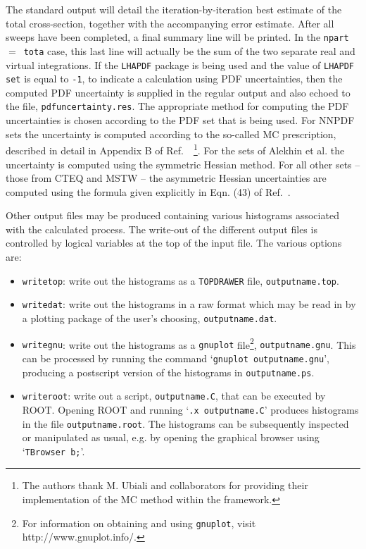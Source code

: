 \documentclass{article}
\begin{document}
The standard output will detail the iteration-by-iteration best estimate
of the total cross-section, together with the accompanying error estimate.
After all sweeps have been completed, a final summary line will be printed.
In the {\tt npart}~$=$~{\tt tota} case, this last line will actually be the
sum of the two separate real and virtual integrations.
If the {\tt LHAPDF} package is being used and the value of
{\tt LHAPDF set} is equal to {\tt -1},  to indicate a calculation using
PDF uncertainties, then the computed PDF uncertainty is
supplied in the regular output and also echoed to the file,
{\tt pdfuncertainty.res}. The appropriate method for computing the PDF
uncertainties is chosen according to the PDF set that is being used.
For NNPDF sets the uncertainty is computed according to the so-called
MC prescription, described in detail in Appendix B of
Ref.~\cite{Ball:2008by}~\footnote{
The authors thank M. Ubiali and collaborators for providing their
implementation of the MC method within the \MCFM framework.}.
For the sets of Alekhin et al. the uncertainty is computed using the
symmetric Hessian method.  For all other sets -- those from CTEQ and
MSTW -- the asymmetric Hessian uncertainties are computed using
the formula given explicitly in
Eqn. (43) of Ref.~\cite{Campbell:2006wx}.

Other output files may be produced containing various histograms associated
with the calculated process. The write-out of the different output files
is controlled by logical variables at the top of the input file. The various options are:
\begin{itemize}
\item {\tt writetop}:  write out the histograms as a {\tt TOPDRAWER} file,
{\tt outputname.top}.
\item {\tt writedat}:  write out the histograms in a raw format 
which may be read in by a plotting package of the user's choosing,
{\tt outputname.dat}.
\item {\tt writegnu}:  write out the histograms as a {\tt gnuplot} file\footnote{
For information on obtaining and using {\tt gnuplot}, visit http://www.gnuplot.info/.},
{\tt outputname.gnu}.  This can be processed by running the command
`{\tt gnuplot outputname.gnu}', producing a postscript version of the histograms
in  {\tt outputname.ps}.
\item {\tt writeroot}:  write out a script, {\tt outputname.C}, that
can be executed by ROOT. Opening ROOT and running `{\tt .x outputname.C}'
produces histograms in the file
{\tt outputname.root}. The histograms can be subsequently inspected or manipulated
as usual, e.g. by opening the graphical browser using `{\tt TBrowser b;}'.
\end{itemize}
\end{document}
